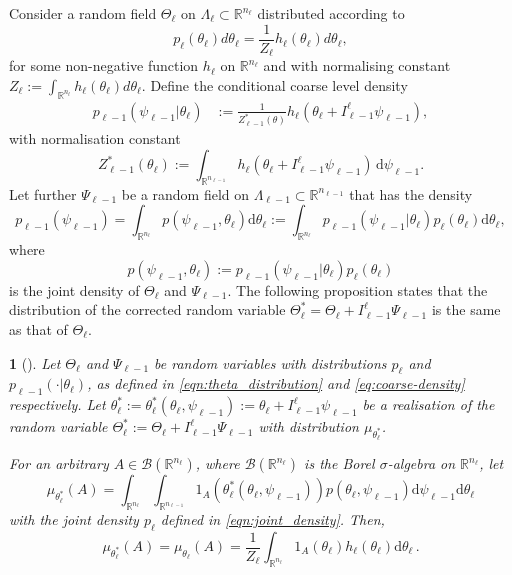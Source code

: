 \documentclass[11pt,english]{article}
\theoremstyle{plain}
\theoremstyle{plain}
\newtheorem{prop}[thm]{\protect\propositionname}
\theoremstyle{plain}
\theoremstyle{plain}
\numberwithin{equation}{section}
\providecommand{\propositionname}{Proposition}
\begin{document}
Consider a random field $\Theta_\ell$ on $\Lambda_{\ell}\subset\mathbb{R}^{n_{\ell}}$ distributed according to
\begin{equation}
	p_{\ell}(\theta_\ell)d\theta_\ell=\frac{1}{Z_\ell}h_{\ell}(\theta_{\ell})d\theta_\ell,
	\label{eqn:theta_distribution}
\end{equation}
for some non-negative function $h_{\ell}$ on $\mathbb{R}^{n_{\ell}}$ %
and with normalising constant $Z_\ell:=\int_{\mathbb{R}^{n_{\ell}}}h_{\ell}(\theta_\ell)d\theta_\ell$.
Define the conditional coarse level density
\begin{align}
	p_{\ell-1}(\psi_{\ell-1}|\theta_\ell) & :=\frac{1}{Z^*_{\ell-1}(\theta)}h_{\ell}(\theta_\ell+I_{\ell-1}^\ell\psi_{\ell-1}),\label{eq:coarse-density}
\end{align}
with normalisation constant
\begin{equation}
	Z^*_{\ell-1}(\theta_\ell):=\int_{\mathbb{R}^{n_{\ell-1}}}h_{\ell}(\theta_\ell+I_{\ell-1}^\ell \psi_{\ell-1})\,\mathrm{d}\psi_{\ell-1}.\label{eqn:Z_theta_normalisation}
\end{equation}
Let further $\Psi_{\ell-1}$ be a random field on $\Lambda_{\ell-1}\subset\mathbb{R}^{n_{\ell-1}}$ that has the density
\[
	p_{\ell-1}(\psi_{\ell-1})=\int_{\mathbb{R}^{n_{\ell}}}p(\psi_{\ell-1},\theta_{\ell})\mathrm{d}\theta_\ell:=\int_{\mathbb{R}^{n_{\ell}}}p_{\ell-1}(\psi_{\ell-1}|\theta_{\ell})p_{\ell}(\theta_\ell)\mathrm{d}\theta_\ell,
\]
where
\begin{equation}
	p(\psi_{\ell-1},\theta_{\ell}):=p_{\ell-1}(\psi_{\ell-1}|\theta_\ell)p_{\ell}(\theta_\ell)\label{eqn:joint_density}
\end{equation}
is the joint density of $\Theta_\ell$ and $\Psi_{\ell-1}$. The following proposition states that the distribution of the corrected random variable $\Theta_\ell^{*}=\Theta_\ell+I_{\ell-1}^\ell\Psi_{\ell-1}$ is the same as that of $\Theta_\ell$.
\begin{prop}[{\cite[Theorem 3]{Liu.J.S_Sabatti_2000_generalised}}]\label{prop:coarse_level_invariance}
	Let $\Theta_\ell$ and $\Psi_{\ell-1}$ be random variables with distributions $p_\ell$ and $p_{\ell-1}(\cdot|\theta_\ell)$, as defined in \eqref{eqn:theta_distribution} and \eqref{eq:coarse-density} respectively. Let $\theta_\ell^{*}:=\theta_\ell^{*}(\theta_\ell,\psi_{\ell-1}):=\theta_\ell+I_{\ell-1}^\ell \psi_{\ell-1}$ be a realisation of the random variable $\Theta_\ell^*:=\Theta_\ell +I_{\ell-1}^\ell\Psi_{\ell-1}$ with distribution $\mu_{\theta_\ell^*}$.

	For an arbitrary $A\in\mathscr{B}(\mathbb{R}^{n_{\ell}})$, where
	$\mathscr{B}(\mathbb{R}^{n_{\ell}})$ is the Borel $\sigma$-algebra
	on $\mathbb{R}^{n_{\ell}}$, let
	\[
		\mu_{\theta_\ell^{*}}(A)=\int_{\mathbb{R}^{n_{\ell}}}\int_{\mathbb{R}^{n_{\ell-1}}}1_{A}(\theta_\ell^{*}(\theta_\ell,\psi_{\ell-1}))p(\theta_\ell,\psi_{\ell-1})\mathrm{d}\psi_{\ell-1}\mathrm{d}\theta_\ell
	\]
	with the joint density $p_\ell$ defined in \eqref{eqn:joint_density}.
	Then,
	\[
		\mu_{\theta_\ell^{*}}(A)=\mu_{\theta_\ell}(A) =\frac{1}{Z_\ell}\int_{\mathbb{R}^{n_{\ell}}}1_{A}(\theta_\ell)h_{\ell}(\theta_\ell)\mathrm{d}\theta_\ell\,.
	\]
\end{prop}
\end{document}
